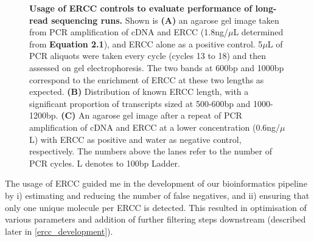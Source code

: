 \begin{figure}[!htp]
\begin{center}
	\end{center}
	\captionsetup{width=0.95\textwidth}
	\caption[Usage of ERCC controls to evaluate performance of long-read sequencing runs]%
	{\textbf{Usage of ERCC controls to evaluate performance of long-read sequencing runs.} Shown is \textbf{(A)} an agarose gel image taken from PCR amplification of cDNA and ERCC (1.8ng/$\mu$L determined from \textbf{Equation 2.1}), and ERCC alone as a positive control. 5$\mu$L of PCR aliquots were taken every cycle (cycles 13 to 18) and then assessed on gel electrophoresis. The two bands at 600bp and 1000bp correspond to the enrichment of ERCC at these two lengths as expected. \textbf{(B)} Distribution of known ERCC length, with a significant proportion of transcripts sized at 500-600bp and 1000-1200bp. \textbf{(C)} An agarose gel image after a repeat of PCR amplification of cDNA and ERCC at a lower concentration (0.6ng/$\mu$L) with ERCC as positive and water as negative control, respectively. The numbers above the lanes refer to the number of PCR cycles. L denotes to 100bp Ladder.}
	\label{fig:ercc_lab_gel}
\end{figure}

The usage of ERCC guided me in the development of our bioinformatics pipeline by i) estimating and reducing the number of false negatives, and ii) ensuring that only one unique molecule per ERCC is detected. This resulted in optimisation of various parameters and addition of further filtering steps downstream (described later in \cref{ercc_development}).  

 
